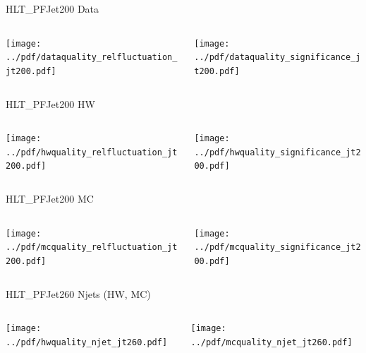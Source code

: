 \documentclass[9pt]{beamer}
\begin{document}
\begin{frame}[t]{HLT\_PFJet200 Data}
\begin{columns}[T]
  \begin{column}{.5\textwidth}
  \texttt{[image: ../pdf/dataquality\_relfluctuation\_jt200.pdf]}
  \end{column}
  \begin{column}{.5\textwidth}
  \texttt{[image: ../pdf/dataquality\_significance\_jt200.pdf]}
  \end{column}
\end{columns}
\end{frame}

\begin{frame}[t]{HLT\_PFJet200 HW}
\begin{columns}[T]
  \begin{column}{.5\textwidth}
  \texttt{[image: ../pdf/hwquality\_relfluctuation\_jt200.pdf]}
  \end{column}
  \begin{column}{.5\textwidth}
  \texttt{[image: ../pdf/hwquality\_significance\_jt200.pdf]}
  \end{column}
\end{columns}
\end{frame}

\begin{frame}[t]{HLT\_PFJet200 MC}
\begin{columns}[T]
  \begin{column}{.5\textwidth}
  \texttt{[image: ../pdf/mcquality\_relfluctuation\_jt200.pdf]}
  \end{column}
  \begin{column}{.5\textwidth}
  \texttt{[image: ../pdf/mcquality\_significance\_jt200.pdf]}
  \end{column}
\end{columns}
\end{frame}

\begin{frame}[t]{HLT\_PFJet260 Njets (HW, MC)}
\begin{columns}[T]
  \begin{column}{.5\textwidth}
  \texttt{[image: ../pdf/hwquality\_njet\_jt260.pdf]}
  \end{column}
  \begin{column}{.5\textwidth}
  \texttt{[image: ../pdf/mcquality\_njet\_jt260.pdf]}
  \end{column}
\end{columns}
\end{frame}
\end{document}
